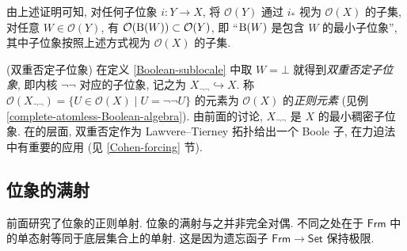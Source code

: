 由上述证明可知, 对任何子位象 $i\colon Y\to X$, 将 $\mathcal O(Y)$ 通过 $i_*$ 视为 $\mathcal O(X)$ 的子集,
对任意 $W\in\mathcal O(Y)$, 有 $\mathcal O(\text{B}(W)) \subset\mathcal O(Y)$,
即 ``$\text{B}(W)$ 是包含 $W$ 的最小子位象'', 其中子位象按照上述方式视为 $\mathcal O(X)$ 的子集.

\begin{example}
	[label={double-negation-sublocale}]
	{(双重否定子位象)}
	在定义 \ref{Boolean-sublocale} 中取 $W=\bot$ 就得到\emph{双重否定子位象},
	即内核 $\neg\neg$ 对应的子位象, 记之为 $X_{\neg\neg}\hookrightarrow X$.
	称 $\mathcal O(X_{\neg\neg}) = \{U\in\mathcal O(X)\mid U = \neg\neg U\}$ 的元素为 $\mathcal O(X)$ 的\emph{正则元素} (见例 \ref{complete-atomless-Boolean-algebra}).
	由前面的讨论, $X_{\neg\neg}$ 是 $X$ 的最小稠密子位象.
	在\topos{}的层面, 双重否定作为 Lawvere--Tierney 拓扑给出一个 Boole 子\topos{}, 在力迫法中有重要的应用 (见 \ref{Cohen-forcing} 节).
\end{example}

\subsection{位象的满射}

前面研究了位象的正则单射. 位象的满射与之并非完全对偶. 不同之处在于 $\mathsf {Frm}$ 中的单态射等同于底层集合上的单射. 这是因为遗忘函子 $\mathsf {Frm}\to\mathsf {Set}$ 保持极限.

